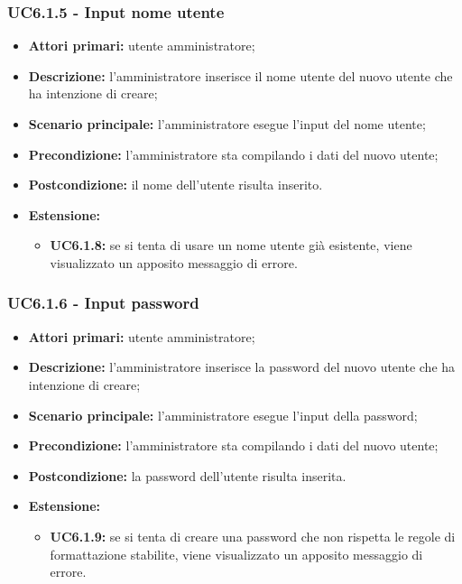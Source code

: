 \subsubsection{UC6.1.5 - Input nome utente}
	\begin{itemize}
		\item \textbf{Attori primari:} utente amministratore;
		\item \textbf{Descrizione:} l'amministratore inserisce il nome utente del nuovo utente che ha intenzione di creare;
		\item \textbf{Scenario principale:} l'amministratore esegue l'input del nome utente;
		\item \textbf{Precondizione:} l'amministratore sta compilando i dati del nuovo utente;
		\item \textbf{Postcondizione:} il nome dell'utente risulta inserito.
		\item \textbf{Estensione:}
		\begin{itemize}
			\item \textbf{UC6.1.8:} se si tenta di usare un nome utente già esistente, viene visualizzato un apposito messaggio di errore.
		\end{itemize}
	\end{itemize}

\subsubsection{UC6.1.6 - Input password}
	\begin{itemize}
		\item \textbf{Attori primari:} utente amministratore;
		\item \textbf{Descrizione:} l'amministratore inserisce la password del nuovo utente che ha intenzione di creare;
		\item \textbf{Scenario principale:} l'amministratore esegue l'input della password;
		\item \textbf{Precondizione:} l'amministratore sta compilando i dati del nuovo utente;
		\item \textbf{Postcondizione:} la password dell'utente risulta inserita.
		\item \textbf{Estensione:}
		\begin{itemize}
			\item \textbf{UC6.1.9:} se si tenta di creare una password che non rispetta le regole di formattazione stabilite, viene visualizzato un apposito messaggio di errore.
		\end{itemize}
	\end{itemize}

